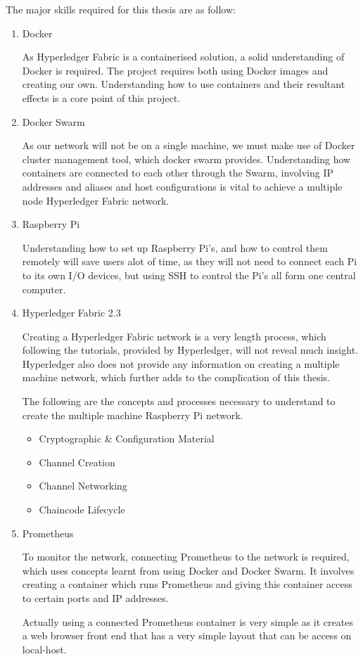 The major skills required for this thesis are as follow:
\begin{enumerate}
    \item Docker
      
      As Hyperledger Fabric is a containerised solution, a solid understanding of Docker is required. The project requires both using Docker images and creating our own. Understanding how to use containers and their resultant effects is a core point of this project.
      
\item Docker Swarm

    As our network will not be on a single machine, we must make use of Docker cluster management tool, which docker swarm provides. Understanding how containers are connected to each other through the Swarm, involving IP addresses and aliases and host configurations is vital to achieve a multiple node Hyperledger Fabric network.
    
\item Raspberry Pi

    Understanding how to set up Raspberry Pi's, and how to control them remotely will save users alot of time, as they will not need to connect each Pi to its own I/O devices, but using SSH to control the Pi's all form one central computer.

\item Hyperledger Fabric 2.3

Creating a Hyperledger Fabric network is a very length process, which following the tutorials, provided by Hyperledger, will not reveal much insight. Hyperledger also does not provide any information on creating a multiple machine network, which further adds to the complication of this thesis.

The following are the concepts and processes necessary to understand to create the multiple machine Raspberry Pi network.
    \begin{itemize}
        \item Cryptographic \& Configuration Material
        \item Channel Creation
        \item Channel Networking
        \item Chaincode Lifecycle
    \end{itemize}
    
    
\item Prometheus

To monitor the network, connecting Prometheus to the network is required, which uses concepts learnt from using Docker and Docker Swarm. It involves creating a container which runs Prometheus and giving this container access to certain ports and  IP addresses. 

Actually using a connected Prometheus container is very simple as it creates a web browser front end that has a very simple layout that can be access on local-host.
\end{enumerate}

